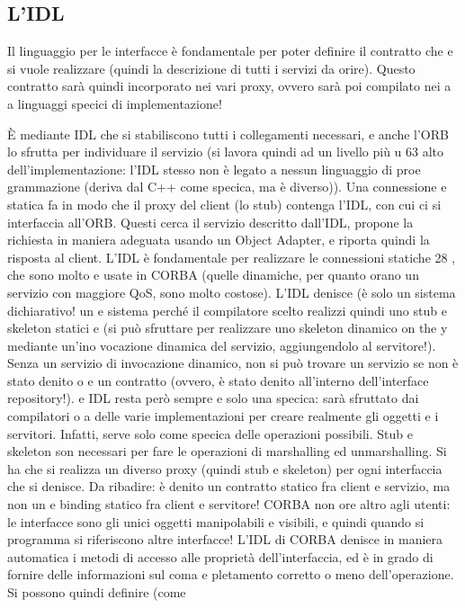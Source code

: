 \subsection{L'IDL}
Il linguaggio per le interfacce è fondamentale per poter definire il contratto che
e
si vuole realizzare (quindi la descrizione di tutti i servizi da orire). Questo
contratto sarà quindi incorporato nei vari proxy, ovvero sarà poi compilato nei
a
a
linguaggi specici di implementazione!

È mediante IDL che si stabiliscono tutti i collegamenti necessari, e anche
l'ORB lo sfrutta per individuare il servizio (si lavora quindi ad un livello più
u
63
alto dell'implementazione: l'IDL stesso non è legato a nessun linguaggio di proe
grammazione (deriva dal C++ come specica, ma è diverso)). Una connessione
e
statica fa in modo che il proxy del client (lo stub) contenga l'IDL, con cui ci
si interfaccia all'ORB. Questi cerca il servizio descritto dall'IDL, propone la
richiesta in maniera adeguata usando un Object Adapter, e riporta quindi la
risposta al client.
L'IDL è fondamentale per realizzare le connessioni statiche 28 , che sono molto
e
usate in CORBA (quelle dinamiche, per quanto orano un servizio con maggiore
QoS, sono molto costose). L'IDL denisce (è solo un sistema dichiarativo! un
e
sistema perché il compilatore scelto realizzi quindi uno stub e skeleton statici
e
(si può sfruttare per realizzare uno skeleton dinamico on the y mediante un'ino
vocazione dinamica del servizio, aggiungendolo al servitore!). Senza un servizio
di invocazione dinamico, non si può trovare un servizio se non è stato denito
o
e
un contratto (ovvero, è stato denito all'interno dell'interface repository!).
e
IDL resta però sempre e solo una specica: sarà sfruttato dai compilatori
o
a
delle varie implementazioni per creare realmente gli oggetti e i servitori. Infatti,
serve solo come specica delle operazioni possibili.
Stub e skeleton son necessari per fare le operazioni di marshalling ed unmarshalling. Si ha che si realizza un diverso
proxy (quindi stub e skeleton) per ogni
interfaccia che si denisce.
Da ribadire: è denito un contratto statico fra client e servizio, ma non un
e
binding statico fra client e servitore!
CORBA non ore altro agli utenti: le interfacce sono gli unici oggetti manipolabili e visibili, e quindi quando si
programma si riferiscono altre interfacce!
L'IDL di CORBA denisce in maniera automatica i metodi di accesso alle
proprietà dell'interfaccia, ed è in grado di fornire delle informazioni sul coma
e
pletamento corretto o meno dell'operazione. Si possono quindi definire (come
